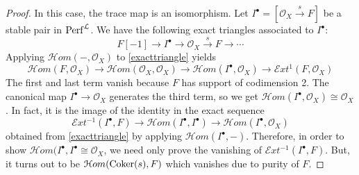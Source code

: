 \begin{proof}
    In this case, the trace map is an isomorphism.
    Let $I^{\bullet}=[\mathcal{O}_X \xrightarrow{s} F]$ be a stable pair in $\mathrm{Perf}^{\mathcal{L}}$. We have the following exact triangles associated to $I^{\bullet}$:
    \begin{equation}\label{exacttriangle}
        F[-1] \to I^{\bullet} \to \mathcal{O}_X \xrightarrow{s} F \to \cdots
    \end{equation}
    Applying $\mathcal{H}om(-,\mathcal{O}_X)$ to \ref{exacttriangle} yields 
    \begin{equation*}
        \mathcal{H}om(F,\mathcal{O}_X) \to \mathcal{H}om(\mathcal{O}_X,\mathcal{O}_X) \to \mathcal{H}om(I^{\bullet},\mathcal{O}_X) \to \mathcal{E}xt^1(F,\mathcal{O}_X)
    \end{equation*}
    The first and last term vanish because $F$ has support of codimension 2. The canonical map $I^{\bullet} \to \mathcal{O}_X$ generates the third term, so we get $\mathcal{H}om(I^{\bullet},\mathcal{O}_X) \cong \mathcal{O}_X$. In fact, it is the image of the identity in the exact sequence 
    \begin{equation*}
        \mathcal{E}xt^{-1}(I^{\bullet},F) \to \mathcal{H}om(I^{\bullet},I^{\bullet}) \to \mathcal{H}om(I^{\bullet},\mathcal{O}_X)
    \end{equation*}
    obtained from \ref{exacttriangle} by applying $\mathcal{H}om(I^{\bullet},-)$. Therefore, in order to show $\mathcal{H}om(I^{\bullet},I^{\bullet} \cong \mathcal{O}_X$, we need only prove the vanishing of $\mathcal{E}xt^{-1}(I^{\bullet},F)$. But, it turns out to be $\mathcal{H}om(\operatorname{Coker}(s),F)$ which vanishes due to purity of $F$.
\end{proof}
